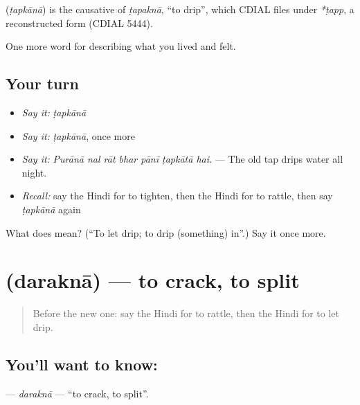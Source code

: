 \begin{cousinweb}
\textbf{} (\emph{ṭapkānā}) is the causative of \emph{ṭapaknā}, \textquotedblleft{}to drip\textquotedblright{}, which CDIAL files under \emph{*ṭapp}, a reconstructed form (CDIAL 5444).
\end{cousinweb}

\begin{grammarlens}[title={What you've built}]
One more word for describing what you lived and felt.
\end{grammarlens}

\subsection*{Your turn}
\begin{itemize}
\raggedright
  \item \emph{Say it:} \emph{ṭapkānā}
  \item \emph{Say it:} \emph{ṭapkānā}, once more
  \item \emph{Say it:} \emph{Purānā nal rāt bhar pānī ṭapkātā hai.} — The old tap drips water all night.
  \item \emph{Recall:} say the Hindi for to tighten, then the Hindi for to rattle, then say \emph{ṭapkānā} again
\end{itemize}

\begin{tcolorbox}[breakable,colback=teal!4,colframe=teal!35!black,title={Before you move on}]
What does  mean? (\textquotedblleft{}To let drip; to drip (something) in\textquotedblright{}.) Say it once more.
\end{tcolorbox}
\section[\texorpdfstring{\hi{दरकना} (daraknā)}{दरकना (daraknā)}]{ (daraknā) — to crack, to split}

\label{lesson:HI-C516-darakna}



\begin{quote}
Before the new one: say the Hindi for to rattle, then the Hindi for to let drip.
\end{quote}

\subsection*{You'll want to know: }
\textbf{} — \emph{daraknā} — \textquotedblleft{}to crack, to split\textquotedblright{}.

